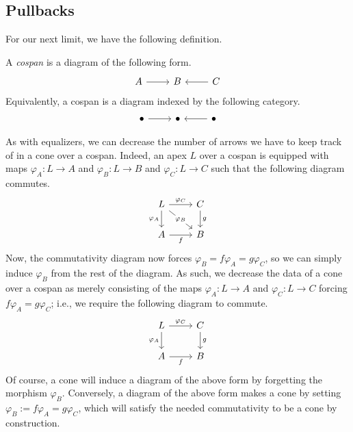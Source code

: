 \subsection{Pullbacks}
For our next limit, we have the following definition.
\begin{definition}[Cospan]
	A \textit{cospan} is a diagram of the following form.
	\[\begin{tikzcd}
		A & B & C
		\arrow[from=1-1, to=1-2]
		\arrow[from=1-3, to=1-2]
	\end{tikzcd}\]
	Equivalently, a cospan is a diagram indexed by the following category.
	\[\begin{tikzcd}
		\bullet & \bullet & \bullet
		\arrow[from=1-1, to=1-2]
		\arrow[from=1-3, to=1-2]
	\end{tikzcd}\]
\end{definition}
As with equalizers, we can decrease the number of arrows we have to keep track of in a cone over a cospan. Indeed, an apex $L$ over a cospan is equipped with maps $\varphi_A:L\to A$ and $\varphi_B:L\to B$ and $\varphi_C:L\to C$ such that the following diagram commutes.
\[\begin{tikzcd}
	L & C \\
	A & B
	\arrow["g", from=1-2, to=2-2]
	\arrow["f"', from=2-1, to=2-2]
	\arrow["{\varphi_C}", from=1-1, to=1-2]
	\arrow["{\varphi_A}"', from=1-1, to=2-1]
	\arrow["{\varphi_B}"{description}, from=1-1, to=2-2]
\end{tikzcd}\]
Now, the commutativity diagram now forces $\varphi_B=f\varphi_A=g\varphi_C$, so we can simply induce $\varphi_B$ from the rest of the diagram. As such, we decrease the data of a cone over a cospan as merely consisting of the maps $\varphi_A:L\to A$ and $\varphi_C:L\to C$ forcing $f\varphi_A=g\varphi_C$; i.e., we require the following diagram to commute.
\[\begin{tikzcd}
	L & C \\
	A & B
	\arrow["g", from=1-2, to=2-2]
	\arrow["f"', from=2-1, to=2-2]
	\arrow["{\varphi_C}", from=1-1, to=1-2]
	\arrow["{\varphi_A}"', from=1-1, to=2-1]
\end{tikzcd}\]
Of course, a cone will induce a diagram of the above form by forgetting the morphism $\varphi_B$. Conversely, a diagram of the above form makes a cone by setting $\varphi_B:=f\varphi_A=g\varphi_C$, which will satisfy the needed commutativity to be a cone by construction.

